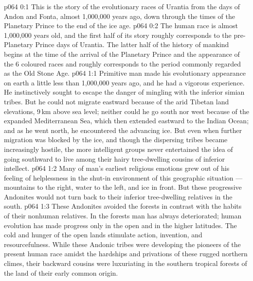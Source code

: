 \author{Life Carrier}
\vs p064 0:1 This is the story of the evolutionary races of Urantia from the days of Andon and Fonta, almost 1,000,000 years ago, down through the times of the Planetary Prince to the end of the ice age.
\vs p064 0:2 The human race is almost 1,000,000 years old, and the first half of its story roughly corresponds to the pre\hyp{}Planetary Prince days of Urantia. The latter half of the history of mankind begins at the time of the arrival of the Planetary Prince and the appearance of the 6 coloured races and roughly corresponds to the period commonly regarded as the Old Stone Age.
\vs p064 1:1 Primitive man made his evolutionary appearance on earth a little less than 1,000,000 years ago, and he had a vigorous experience. He instinctively sought to escape the danger of mingling with the inferior simian tribes. But he could not migrate eastward because of the arid Tibetan land elevations, 9\,km above sea level; neither could he go south nor west because of the expanded Mediterranean Sea, which then extended eastward to the Indian Ocean; and as he went north, he encountered the advancing ice. But even when further migration was blocked by the ice, and though the dispersing tribes became increasingly hostile, the more intelligent groups never entertained the idea of going southward to live among their hairy tree\hyp{}dwelling cousins of inferior intellect.
\vs p064 1:2 Many of man’s earliest religious emotions grew out of his feeling of helplessness in the shut\hyp{}in environment of this geographic situation --- mountains to the right, water to the left, and ice in front. But these progressive Andonites would not turn back to their inferior tree\hyp{}dwelling relatives in the south.
\vs p064 1:3 These Andonites avoided the forests in contrast with the habits of their nonhuman relatives. In the forests man has always deteriorated; human evolution has made progress only in the open and in the higher latitudes. The cold and hunger of the open lands stimulate action, invention, and resourcefulness. While these Andonic tribes were developing the pioneers of the present human race amidst the hardships and privations of these rugged northern climes, their backward cousins were luxuriating in the southern tropical forests of the land of their early common origin.
